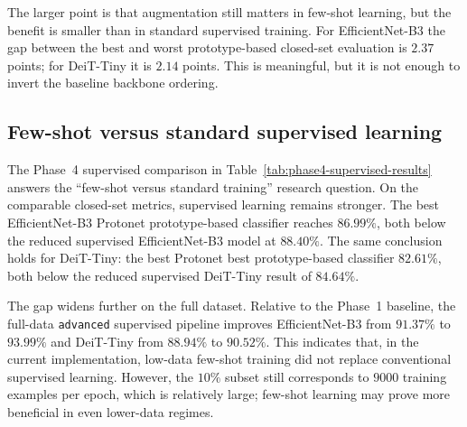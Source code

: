 \documentclass[12pt,a4paper]{article}
\begin{document}
The larger point is that augmentation still matters in few-shot learning, but the benefit is smaller than in standard supervised training. For EfficientNet-B3 the gap between the best and worst prototype-based closed-set evaluation is $2.37$ points; for DeiT-Tiny it is $2.14$ points. This is meaningful, but it is not enough to invert the baseline backbone ordering.

\subsection{Few-shot versus standard supervised learning}
\label{subsec:phase4-supervised-results}

\begin{table}[t!]
\centering
\caption{Phase~4 supervised comparison (mean $\pm$ standard deviation over three seeds, all values in \%)}
\label{tab:phase4-supervised-results}
\smallskip
\small
{}
\end{table}

The Phase~4 supervised comparison in Table~\ref{tab:phase4-supervised-results} answers the ``few-shot versus standard training'' research question. On the comparable closed-set metrics, supervised learning remains stronger. The best EfficientNet-B3 Protonet prototype-based classifier reaches $86.99\%$, both below the reduced supervised EfficientNet-B3 model at $88.40\%$. The same conclusion holds for DeiT-Tiny: the best Protonet best prototype-based classifier $82.61\%$, both below the reduced supervised DeiT-Tiny result of $84.64\%$.

The gap widens further on the full dataset. Relative to the Phase~1 baseline, the full-data \texttt{advanced} supervised pipeline improves EfficientNet-B3 from $91.37\%$ to $93.99\%$ and DeiT-Tiny from $88.94\%$ to $90.52\%$. This indicates that, in the current implementation, low-data few-shot training did not replace conventional supervised learning. However, the $10\%$ subset still corresponds to $9000$ training examples per epoch, which is relatively large; few-shot learning may prove more beneficial in even lower-data regimes.
\end{document}
